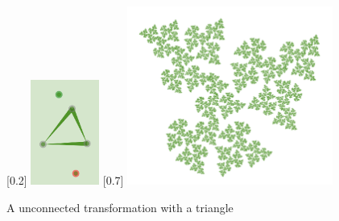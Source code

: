         \begin{figure}[ht]
            \caption{\label{simple_un_triangle_01} A unconnected transformation with a triangle}
            \centering
            \subcaptionbox{}[0.2\textwidth]
                {\includegraphics[width=0.2\textwidth]{img/Simple_Techniques/Unconnect/simple_un_setup_triangle_01.png}}
            \subcaptionbox{}[0.7\textwidth]
                {\includegraphics[width=0.6\textwidth]{img/Simple_Techniques/Unconnect/simple_un_triangle_01.png}}
        \end{figure}

        \FloatBarrier

